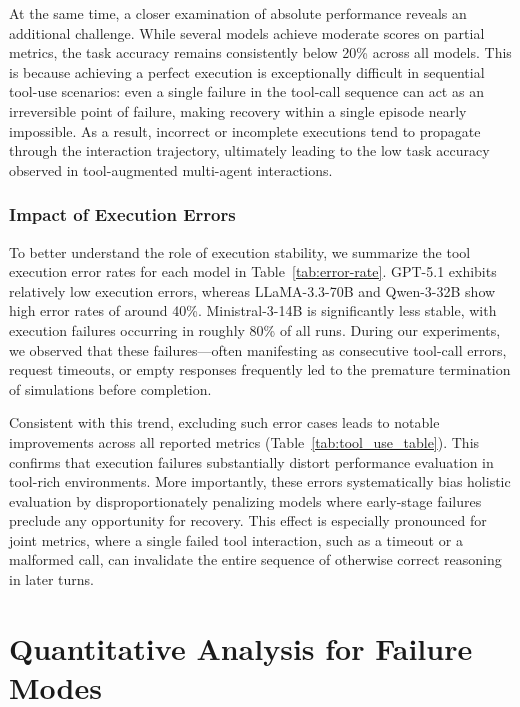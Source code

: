 At the same time, a closer examination of absolute performance reveals an additional challenge. While several models achieve moderate scores on partial metrics, the task accuracy remains consistently below 20\% across all models. This is because achieving a perfect execution is exceptionally difficult in sequential tool-use scenarios: even a single failure in the tool-call sequence can act as an irreversible point of failure, making recovery within a single episode nearly impossible. As a result, incorrect or incomplete executions tend to propagate through the interaction trajectory, ultimately leading to the low task accuracy observed in tool-augmented multi-agent interactions.


\subsubsection{Impact of Execution Errors}


To better understand the role of execution stability, we summarize the tool execution error rates for each model in Table~\ref{tab:error-rate}. GPT-5.1 exhibits relatively low execution errors, whereas LLaMA-3.3-70B and Qwen-3-32B show high error rates of around 40\%. Ministral-3-14B is significantly less stable, with execution failures occurring in roughly 80\% of all runs. During our experiments, we observed that these failures—often manifesting as consecutive tool-call errors, request timeouts, or empty responses frequently led to the premature termination of simulations before completion.

Consistent with this trend, excluding such error cases leads to notable improvements across all reported metrics (Table~\ref{tab:tool_use_table}). This confirms that execution failures substantially distort performance evaluation in tool-rich environments. More importantly, these errors systematically bias holistic evaluation by disproportionately penalizing models where early-stage failures preclude any opportunity for recovery. This effect is especially pronounced for joint metrics, where a single failed tool interaction, such as a timeout or a malformed call, can invalidate the entire sequence of otherwise correct reasoning in later turns.

\label{app:experiment_result}



\section{Quantitative Analysis for Failure Modes}
\label{appendix:failure_modes}

